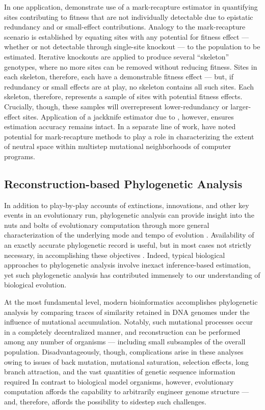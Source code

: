 In one application, \citet{moreno2024methods} demonstrate use of a mark-recapture estimator in quantifying sites contributing to fitness that are not individually detectable due to epistatic redundancy and or small-effect contributions.
Analogy to the mark-recapture scenario is established by equating sites with any potential for fitness effect --- whether or not detectable through single-site knockout --- to the population to be estimated.
Iterative knockouts are applied to produce several ``skeleton'' genotypes, where no more sites can be removed without reducing fitness.
Sites in each skeleton, therefore, each have a demonstrable fitness effect --- but, if redundancy or small effects are at play, no skeleton contains all such sites.
Each skeleton, therefore, represents a sample of sites with potential fitness effects.
Crucially, though, these samples will overrepresent lower-redundancy or larger-effect sites.
Application of a jackknife estimator due to \citet{burnham1979robust}, however, ensures estimation accuracy remains intact.
In a separate line of work, \citet{schulte2014software} have noted potential for mark-recapture methods to play a role in characterizing the extent of neutral space within multistep mutational neighborhoods of computer programs.

\subsection{Reconstruction-based Phylogenetic Analysis}

In addition to play-by-play accounts of extinctions, innovations, and other key events in an evolutionary run, phylogenetic analysis can provide insight into the nuts and bolts of evolutionary computation through more general characterization of the underlying mode and tempo of evolution \citep{moreno2023toward,hernandez2022can,shahbandegan2022untangling,lewinsohn2023statedependent}.
Availability of an exactly accurate phylogenetic record is useful, but in most cases not strictly necessary, in accomplishing these objectives \citep{moreno2024ecology}.
Indeed, typical biological approaches to phylogenetic analysis involve inexact inference-based estimation, yet such phylogenetic analysis has contributed immensely to our understanding of biological evolution.

At the most fundamental level, modern bioinformatics accomplishes phylogenetic analysis by comparing traces of similarity retained in DNA genomes under the influence of mutational accumulation.
Notably, such mutational processes occur in a completely decentralized manner, and reconstruction can be performed among any number of organisms --- including small subsamples of the overall population.
Disadvantageously, though, complications arise in these analyses owing to issues of back mutation, mutational saturation, selection effects, long branch attraction, and the vast quantities of genetic sequence information required \citep{TODO}
In contrast to biological model organisms, however, evolutionary computation affords the capability to arbitrarily engineer genome structure --- and, therefore, affords the possibility to sidestep such challenges.

